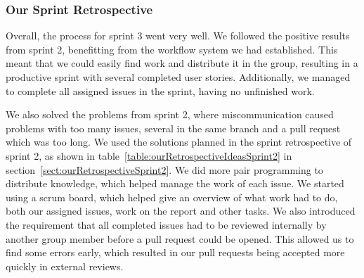 \subsubsection{Our Sprint Retrospective}
Overall, the process for sprint 3 went very well. We followed the positive results from sprint 2, benefitting from the workflow system we had established. This meant that we could easily find work and distribute it in the group, resulting in a productive sprint with several completed user stories. Additionally, we managed to complete all assigned issues in the sprint, having no unfinished work.

We also solved the problems from sprint 2, where miscommunication caused problems with too many issues, several in the same branch and a pull request which was too long. 
We used the solutions planned in the sprint retrospective of sprint 2, as shown in table~\ref{table:ourRetrospectiveIdeasSprint2} in section~\ref{sect:ourRetrospectiveSprint2}. 
We did more pair programming to distribute knowledge, which helped manage the work of each issue. 
We started using a scrum board, which helped give an overview of what work had to do, both our assigned issues, work on the report and other tasks. 
We also introduced the requirement that all completed issues had to be reviewed internally by another group member before a pull request could be opened. This allowed us to find some errors early, which resulted in our pull requests being accepted more quickly in external reviews. 

